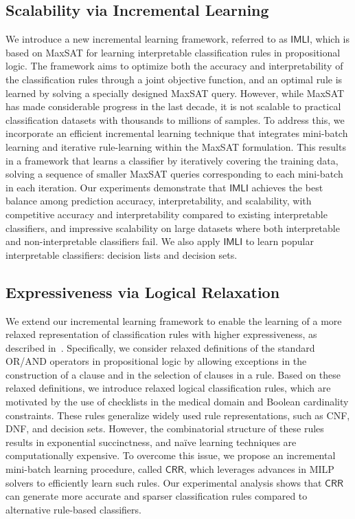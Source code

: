 \documentclass{article}
\begin{document}
\subsection*{Scalability via Incremental Learning}
We introduce a new incremental learning framework, referred to as $\mathsf{IMLI}$, which is based on MaxSAT for learning interpretable classification rules in propositional logic. The framework aims to optimize both the accuracy and interpretability of the classification rules through a joint objective function, and an optimal rule is learned by solving a specially designed MaxSAT query. However, while MaxSAT has made considerable progress in the last decade, it is not scalable to practical classification datasets with thousands to millions of samples. To address this, we incorporate an efficient incremental learning technique that integrates mini-batch learning and iterative rule-learning within the MaxSAT formulation. This results in a framework that learns a classifier by iteratively covering the training data, solving a sequence of smaller MaxSAT queries corresponding to each mini-batch in each iteration. Our experiments demonstrate that $\mathsf{IMLI}$ achieves the best balance among prediction accuracy, interpretability, and scalability, with competitive accuracy and interpretability compared to existing interpretable classifiers, and impressive scalability on large datasets where both interpretable and non-interpretable classifiers fail. We also apply $\mathsf{IMLI}$ to learn popular interpretable classifiers: decision lists and decision sets.

\subsection*{Expressiveness via Logical Relaxation}
We extend our incremental learning framework to enable the learning of a more relaxed representation of classification rules with higher expressiveness, as described in~\cite{ghosh2020classification}. Specifically, we consider relaxed definitions of the standard OR/AND operators in propositional logic by allowing exceptions in the construction of a clause and in the selection of clauses in a rule. Based on these relaxed definitions, we introduce relaxed logical classification rules, which are motivated by the use of checklists in the medical domain and Boolean cardinality constraints. These rules generalize widely used rule representations, such as CNF, DNF, and decision sets. However, the combinatorial structure of these rules results in exponential succinctness, and na\"ive learning techniques are computationally expensive. To overcome this issue, we propose an incremental mini-batch learning procedure, called $\mathsf{CRR}$, which leverages advances in MILP solvers to efficiently learn such rules. Our experimental analysis shows that $\mathsf{CRR}$ can generate more accurate and sparser classification rules compared to alternative rule-based classifiers.
\end{document}
